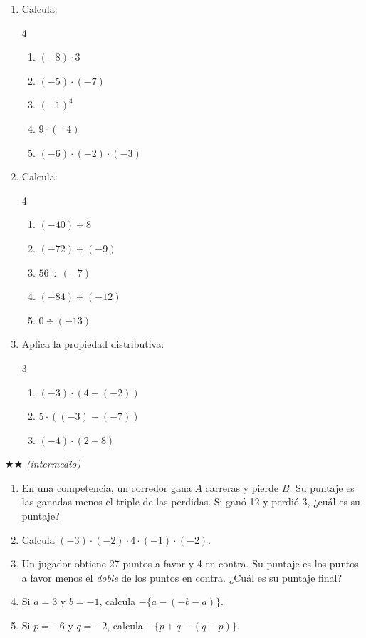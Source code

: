 \documentclass[11pt, letterpaper]{article}
\begin{document}
\begin{enumerate}[label=\textbf{\arabic*.}, leftmargin=*]
  \item Calcula:
  \begin{multicols}{4}
  \begin{enumerate}[label=\alph*)]
    \item $(-8)\cdot 3$
    \item $(-5)\cdot(-7)$
    \item $(-1)^4$
    \item $9\cdot(-4)$
    \item $(-6)\cdot(-2)\cdot(-3)$
  \end{enumerate}
  \end{multicols}

  \item Calcula:
  \begin{multicols}{4}
  \begin{enumerate}[label=\alph*)]
    \item $(-40)\div 8$
    \item $(-72)\div(-9)$
    \item $56\div(-7)$
    \item $(-84)\div(-12)$
    \item $0\div(-13)$
  \end{enumerate}
  \end{multicols}

  \item Aplica la propiedad distributiva:
  \begin{multicols}{3}
  \begin{enumerate}[label=\alph*)]
    \item $(-3)\cdot(4+(-2))$
    \item $5\cdot((-3)+(-7))$
    \item $(-4)\cdot(2-8)$
  \end{enumerate}
  \end{multicols}
\end{enumerate}

$\bigstar\bigstar$ \textit{(intermedio)}

\begin{enumerate}[label=\textbf{\arabic*.}, leftmargin=*, resume]
  \item En una competencia, un corredor gana $A$ carreras y pierde $B$. Su puntaje es las ganadas menos el triple de las perdidas. Si gan\'o 12 y perdi\'o 3, ¿cu\'al es su puntaje?

  \item Calcula $(-3)\cdot(-2)\cdot 4\cdot(-1)\cdot(-2)$.

  \item Un jugador obtiene 27 puntos a favor y 4 en contra. Su puntaje es los puntos a favor menos el \emph{doble} de los puntos en contra. ¿Cu\'al es su puntaje final?

  \item Si $a=3$ y $b=-1$, calcula $-\{a-(-b-a)\}$.

  \item Si $p=-6$ y $q=-2$, calcula $-\{p+q-(q-p)\}$.
\end{enumerate}
\end{document}
